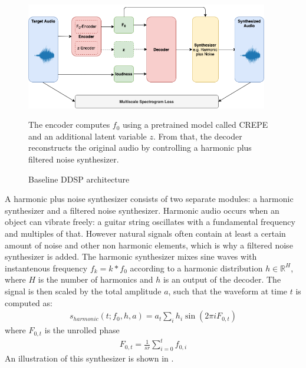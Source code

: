 \begin{figure}
    \caption{Baseline DDSP architecture}
    \label{ddsp-schema}
    \begin{center}
        \includegraphics[width=400px]{schema/ddsp.png}
    \end{center}
        {\small The encoder computes $f_0$ using a pretrained model called CREPE and an additional latent variable $z$. From that, the decoder reconstructs the original audio by controlling a harmonic plus filtered noise synthesizer.
        }
\end{figure}

A harmonic plus noise synthesizer consists of two separate modules: a harmonic synthesizer and a filtered noise synthesizer.
Harmonic audio occurs when an object can vibrate freely: a guitar string oscillates with a fundamental frequency and multiples of that.
However natural signals often contain at least a certain amount of noise and other non harmonic elements, which is why a filtered noise synthesizer is added. \newline
The harmonic synthesizer mixes sine waves with instantenous frequency $f_k = k * f_0$ according to a harmonic distribution $h \in \mathbb{R}^H$, where $H$ is the number of harmonics and $h$ is an output of the decoder. The signal is then scaled by the total amplitude $a$, such that the waveform at time $t$ is computed as:
\begin{equation}
    \begin{split}
    s_{harmonic}(t; f_0, h, a) = a_t \sum_i h_i \sin(2 \pi i F_{0, t})
\end{split}
\end{equation}
where $F_{0, t}$ is the unrolled phase
\begin{equation}
    \begin{split}
    F_{0, t} = \frac{1}{sr} \sum_{i = 0}^{t} f_{0,i}
\end{split}
\end{equation}
An illustration of this synthesizer is shown in . \newline

